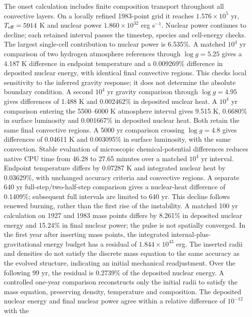 \documentclass[11pt,letterpaper]{article}
\begin{document}
The onset calculation includes finite composition transport throughout all
convective layers. On a locally refined 1983-point grid it reaches
$1.576\times10^5$ yr, $T_{\rm eff}=5914$ K and nuclear power
$1.860\times10^{32}$ erg s$^{-1}$. Nuclear power continues to decline;
each retained interval passes the timestep, species and cell-energy checks.
The largest single-cell contribution to nuclear power is 6.535\%.
A matched $10^4$ yr comparison of two hydrogen atmosphere references
through $\log g=5.25$ gives a 4.187 K difference in endpoint temperature
and a 0.009269\% difference in deposited nuclear energy, with identical
final convective regions. This checks local sensitivity to the inferred
gravity response; it does not determine the absolute boundary condition.
A second $10^4$ yr gravity comparison through $\log g=4.95$
gives differences of 1.488 K and 0.002462\% in deposited nuclear heat.
A $10^4$ yr comparison entering the 5500--6000 K atmosphere interval
gives 9.515 K, 0.6680\% in surface luminosity and 0.001667\%
in deposited nuclear heat. Both retain the same final convective regions.
A 5000 yr comparison crossing $\log g=4.8$ gives differences of
0.04611 K and 0.003095\% in surface luminosity, with the same convection.
Stable evaluation of microscopic chemical-potential differences reduces
native CPU time from 46.28 to 27.65 minutes over a matched $10^4$ yr interval.
Endpoint temperature differs by 0.07287 K and integrated nuclear heat by
0.03629\%, with unchanged accuracy criteria and convective regions.
A separate 640 yr full-step/two-half-step comparison gives a nuclear-heat
difference of 0.1409\%; subsequent full intervals are limited to 640 yr.
This decline follows renewed burning, rather than the first rise of the
instability. A matched 100 yr calculation on 1927 and 1983 mass points
differs by 8.261\% in deposited nuclear energy and 15.24\% in final
nuclear power; the pulse is not spatially converged. In the first year
after inserting mass points, the integrated internal-plus-gravitational
energy budget has a residual of $1.844\times10^{43}$ erg. The inserted
radii and densities do not satisfy the discrete mass equation to the
same accuracy as the evolved structure, indicating an initial mechanical
readjustment. Over the following 99 yr, the residual is 0.2739\% of the
deposited nuclear energy. A controlled one-year comparison reconstructs
only the initial radii to satisfy the mass equation, preserving density,
temperature and composition. The deposited nuclear energy and final
nuclear power agree within a relative difference of $10^{-12}$ with the
\end{document}
